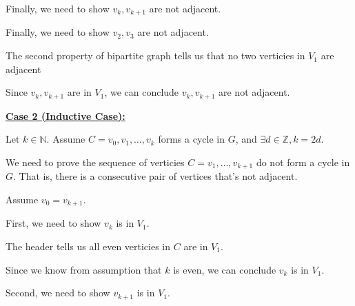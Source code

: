 \documentclass[12pt]{article}
\begin{document}
\begin{enumerate}[a.]
\begin{mdframed}
\begin{enumerate}[1.]
\begin{itemize}
                \bigskip

                Finally, we need to show $v_k,v_{k+1}$ are not adjacent.

                \bigskip

                \begin{mdframed}
                Finally, we need to show $v_2, v_3$ are not adjacent.

                \bigskip

                The second property of bipartite graph tells us that no two
                verticies in $V_1$ are adjacent

                \bigskip

                Since $v_k,v_{k+1}$ are in $V_1$, we can conclude $v_k,v_{k+1}$ are not
                adjacent.
                \end{mdframed}
            \end{itemize}

            \begin{mdframed}
                \underline{\textbf{Case 2 (Inductive Case):}}

                \bigskip

                Let $k \in \mathbb{N}$. Assume $C=v_0,v_1,\dots,v_k$ forms a cycle
                in $G$, and $\exists d \in \mathbb{Z}, k = 2d$.

                \bigskip

                We need to prove the sequence of verticies $C = v_1,\dots,v_{k+1}$
                do not form a cycle in $G$. That is, there is a consecutive pair of
                vertices that's not adjacent.

                \bigskip

                Assume $v_0 = v_{k+1}$.

                \bigskip

                First, we need to show $v_k$ is in $V_1$.

                \bigskip

                The header tells us all even verticies in $C$ are in $V_1$.

                \bigskip

                Since we know from assumption that $k$ is even, we can conclude
                $v_k$ is in $V_1$.

                \bigskip

                Second, we need to show $v_{k+1}$ is in $V_1$.


\end{mdframed}
\end{enumerate}
\end{mdframed}
\end{enumerate}
\end{document}
